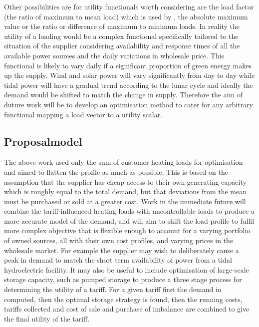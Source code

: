 \documentclass[a4paper, 10 pt, conference]{ieeeconf}  %
\begin{document}
Other possibilities are for utility functionals worth considering are the load factor (the ratio of maximum to mean load) which is used by \cite{ramchurn2011agent}, the absolute maximum value or the ratio or difference of maximum to minimum loads. In reality the utility of a loading would be a complex functional specifically tailored to the situation of the supplier considering availability and response times of all the available power sources and the daily variations in wholesale price. This functional is likely to vary daily if a significant proportion of green energy makes up the supply. Wind and solar power will vary significantly from day to day while tidal power will have a gradual trend according to the lunar cycle and ideally the demand would be shifted to match the change in supply. Therefore the aim of duture work will be to develop an optimisation method to cater for any arbitrary functional mapping a load vector to a utility scalar.


\subsection{Proposalmodel}

The above work used only the sum of customer heating loads for optimisation and aimed to flatten the profile as much as possible. This is based on the assumption that the supplier has cheap access to their own generating capacity which is roughly equal to the total demand, but that deviations from the mean must be purchased or sold at a greater cost. Work in the immediate future will combine the tariff-influenced heating loads with uncontrollable loads to produce a more accurate model of the demand, and will aim to shift the load profile to fulfil more complex objective that is flexible enough to account for a varying portfolio of owned sources, all with their own cost profiles, and varying prices in the wholesale market. For example the supplier may wish to deliberately cause a peak in demand to match the short term availability of power from a tidal hydroelectric facility. It may also be useful to include optimisation of large-scale storage capacity, such as pumped storage to produce a three stage process for determining the utility of a tariff. For a given tariff first the demand in computed, then the optimal storage strategy is found, then the running costs, tariffs collected and cost of sale and purchase of imbalance are combined to give the final utility of the tariff.
\end{document}
